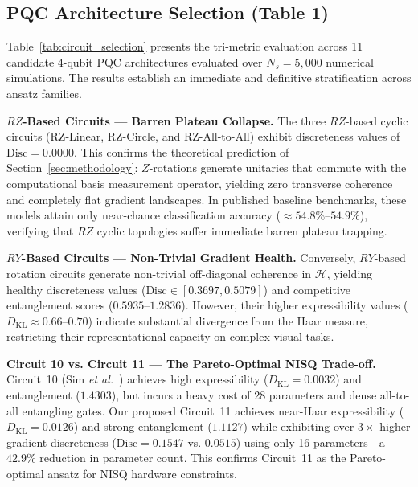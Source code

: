 \documentclass[journal]{IEEEtran}
\begin{document}
\subsection{PQC Architecture Selection (Table 1)}
Table~\ref{tab:circuit_selection} presents the tri-metric evaluation across 11 candidate 4-qubit PQC architectures evaluated over $N_s = 5{,}000$ numerical simulations. The results establish an immediate and definitive stratification across ansatz families.

\textbf{$RZ$-Based Circuits --- Barren Plateau Collapse.} The three $RZ$-based cyclic circuits (RZ-Linear, RZ-Circle, and RZ-All-to-All) exhibit discreteness values of $\mathrm{Disc} = 0.0000$. This confirms the theoretical prediction of Section~\ref{sec:methodology}: $Z$-rotations generate unitaries that commute with the computational basis measurement operator, yielding zero transverse coherence and completely flat gradient landscapes. In published baseline benchmarks, these models attain only near-chance classification accuracy ($\approx 54.8\%$--$54.9\%$), verifying that $RZ$ cyclic topologies suffer immediate barren plateau trapping.

\textbf{$RY$-Based Circuits --- Non-Trivial Gradient Health.} Conversely, $RY$-based rotation circuits generate non-trivial off-diagonal coherence in $\mathcal{H}$, yielding healthy discreteness values ($\mathrm{Disc} \in [0.3697, 0.5079]$) and competitive entanglement scores ($0.5935$--$1.2836$). However, their higher expressibility values ($D_{\mathrm{KL}} \approx 0.66$--$0.70$) indicate substantial divergence from the Haar measure, restricting their representational capacity on complex visual tasks.

\textbf{Circuit 10 vs. Circuit 11 --- The Pareto-Optimal NISQ Trade-off.} Circuit~10 (Sim \textit{et al.}~\cite{sim2019expressibility}) achieves high expressibility ($D_{\mathrm{KL}} = 0.0032$) and entanglement ($1.4303$), but incurs a heavy cost of 28 parameters and dense all-to-all entangling gates. Our proposed Circuit~11 achieves near-Haar expressibility ($D_{\mathrm{KL}} = 0.0126$) and strong entanglement ($1.1127$) while exhibiting over $3\times$ higher gradient discreteness ($\mathrm{Disc} = 0.1547$ vs. $0.0515$) using only 16 parameters---a $42.9\%$ reduction in parameter count. This confirms Circuit~11 as the Pareto-optimal ansatz for NISQ hardware constraints.
\end{document}
